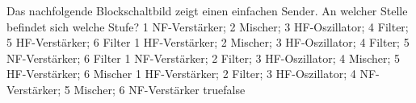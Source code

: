    {Das nachfolgende Blockschaltbild zeigt einen einfachen Sender. An welcher Stelle befindet sich welche Stufe?}
    {1 NF-Verstärker; 
2 Mischer; 
3 HF-Oszillator;  
4 Filter; 
5 HF-Verstärker; 
6 Filter}
    {1 HF-Verstärker; 
2 Mischer; 
3 HF-Oszillator;  
4 Filter; 
5 NF-Verstärker; 
6 Filter
}
    {1 NF-Verstärker; 
2 Filter; 
3 HF-Oszillator;  
4 Mischer; 
5 HF-Verstärker;
6 Mischer}
    {1 HF-Verstärker; 
2 Filter; 
3 HF-Oszillator;  
4 NF-Verstärker; 
5 Mischer;
6 NF-Verstärker
}
    {true}{false}